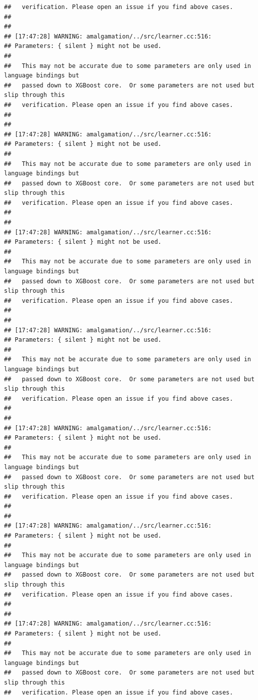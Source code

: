 \documentclass[AMS,STIX2COL]{WileyNJD-v2}\usepackage[]{graphicx}\usepackage[]{color}
\makeatletter
\newenvironment{kframe}{%
 \def\at@end@of@kframe{}%
 \ifinner\ifhmode%
  \def\at@end@of@kframe{\end{minipage}}%
  \begin{minipage}{\columnwidth}%
 \fi\fi%
 \def\FrameCommand##1{\hskip\@totalleftmargin \hskip-\fboxsep
 \colorbox{shadecolor}{##1}\hskip-\fboxsep
     \hskip-\linewidth \hskip-\@totalleftmargin \hskip\columnwidth}%
 \MakeFramed {\advance\hsize-\width
   \@totalleftmargin\z@ \linewidth\hsize
   \@setminipage}}%
 {\par\unskip\endMakeFramed%
 \at@end@of@kframe}
\newenvironment{knitrout}{}{} %
\makeatother
\begin{document}
\begin{knitrout}
\begin{kframe}
\begin{verbatim}
##   verification. Please open an issue if you find above cases.
## 
## 
## [17:47:28] WARNING: amalgamation/../src/learner.cc:516: 
## Parameters: { silent } might not be used.
## 
##   This may not be accurate due to some parameters are only used in language bindings but
##   passed down to XGBoost core.  Or some parameters are not used but slip through this
##   verification. Please open an issue if you find above cases.
## 
## 
## [17:47:28] WARNING: amalgamation/../src/learner.cc:516: 
## Parameters: { silent } might not be used.
## 
##   This may not be accurate due to some parameters are only used in language bindings but
##   passed down to XGBoost core.  Or some parameters are not used but slip through this
##   verification. Please open an issue if you find above cases.
## 
## 
## [17:47:28] WARNING: amalgamation/../src/learner.cc:516: 
## Parameters: { silent } might not be used.
## 
##   This may not be accurate due to some parameters are only used in language bindings but
##   passed down to XGBoost core.  Or some parameters are not used but slip through this
##   verification. Please open an issue if you find above cases.
## 
## 
## [17:47:28] WARNING: amalgamation/../src/learner.cc:516: 
## Parameters: { silent } might not be used.
## 
##   This may not be accurate due to some parameters are only used in language bindings but
##   passed down to XGBoost core.  Or some parameters are not used but slip through this
##   verification. Please open an issue if you find above cases.
## 
## 
## [17:47:28] WARNING: amalgamation/../src/learner.cc:516: 
## Parameters: { silent } might not be used.
## 
##   This may not be accurate due to some parameters are only used in language bindings but
##   passed down to XGBoost core.  Or some parameters are not used but slip through this
##   verification. Please open an issue if you find above cases.
## 
## 
## [17:47:28] WARNING: amalgamation/../src/learner.cc:516: 
## Parameters: { silent } might not be used.
## 
##   This may not be accurate due to some parameters are only used in language bindings but
##   passed down to XGBoost core.  Or some parameters are not used but slip through this
##   verification. Please open an issue if you find above cases.
## 
## 
## [17:47:28] WARNING: amalgamation/../src/learner.cc:516: 
## Parameters: { silent } might not be used.
## 
##   This may not be accurate due to some parameters are only used in language bindings but
##   passed down to XGBoost core.  Or some parameters are not used but slip through this
##   verification. Please open an issue if you find above cases.

\end{verbatim}
\end{kframe}
\end{knitrout}
\end{document}
